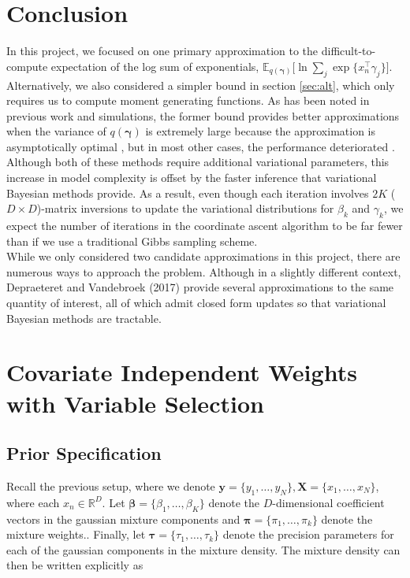 \documentclass[twoside,11pt]{article}
\newcommand{\tr}{\intercal}
\newcommand{\R}{\mathbb{R}}
\newcommand{\boldbeta}{\boldsymbol\beta}
\newcommand{\boldgamma}{\boldsymbol\gamma}
\newcommand{\boldtau}{\boldsymbol\tau}
\newcommand{\E}{\mathbb{E}}
\begin{document}
\section{Conclusion}
In this project, we focused on one primary approximation to the difficult-to-compute expectation of the log sum of exponentials, $\E_{q(\boldsymbol\gamma)}\big[\ln \sum_{j} \exp \{ x_n^{\tr} \gamma_j \} \big]$. 
Alternatively, we also considered a simpler bound in section \ref{sec:alt}, which only requires us to compute moment generating functions. As has been noted in previous work and simulations, the former bound provides better approximations when the variance of $q(\boldgamma)$ is extremely large because the approximation is asymptotically optimal \parencite{bouchard:07}, but in most other cases, the performance deteriorated \parencite{Depraetere:17}. Although both of these methods require additional variational parameters, this increase in model complexity is offset by the faster inference that variational Bayesian methods provide. As a result, even though each iteration involves $2K$ ($D \times D$)-matrix inversions to update the variational distributions for $\beta_k$ and $\gamma_k$, we expect the number of iterations in the coordinate ascent algorithm to be far fewer than if we use a traditional Gibbs sampling scheme. \\

While we only considered two candidate approximations in this project, there are numerous ways to approach the problem. Although in a slightly different context, Depraeteret and Vandebroek (2017) provide several approximations to the same quantity of interest, all of which admit closed form updates so that variational Bayesian methods are tractable. 


\newpage

\section{Covariate Independent Weights with Variable Selection}

\subsection{Prior Specification}

Recall the previous setup, where we denote $\mathbf{y} = \{y_1, \ldots, y_N \}, \mathbf{X} = \{ x_1, \ldots, x_N \}$, where each $x_n \in \R^{D}$. Let $\boldbeta = \{ \beta_1, \ldots, \beta_K\}$ denote the $D$-dimensional coefficient vectors  in the gaussian mixture components and $\boldsymbol \pi = \{ \pi_1, \ldots, \pi_k\}$ denote the mixture weights.. Finally, let $\boldtau = \{ \tau_1, \ldots, \tau_k \}$ denote the precision parameters for each of the gaussian components in the mixture density. The mixture density can then be written explicitly as
\end{document}
